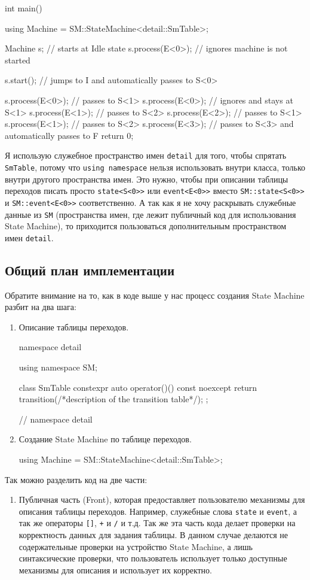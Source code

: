 \documentclass{article}
\begin{document}
{\begin{cppcode}
int main() {

  using Machine = SM::StateMachine<detail::SmTable>;

  Machine s;         // starts at Idle state
  s.process(E<0>{}); // ignores machine is not started

  s.start();         // jumps to I and automatically passes to S<0>

  s.process(E<0>{}); // passes to S<1>
  s.process(E<0>{}); // ignores and stays at S<1>
  s.process(E<1>{}); // passes to S<2>
  s.process(E<2>{}); // passes to S<1>
  s.process(E<1>{}); // passes to S<2>
  s.process(E<3>{}); // passes to S<3> and automatically passes to F
  return 0;
}
\end{cppcode}
Я использую служебное пространство имен \verb"detail" для того, чтобы спрятать \verb"SmTable", потому что \verb"using namespace" нельзя использовать внутри класса, только внутри другого пространства имен.
Это нужно, чтобы при описании таблицы переходов писать просто \verb"state<S<0>>" или \verb"event<E<0>>" вместо \verb"SM::state<S<0>>" и \verb"SM::event<E<0>>" соответственно.
А так как я не хочу раскрывать служебные данные из \verb"SM" (пространства имен, где лежит публичный код для использования State Machine), то приходится пользоваться дополнительным пространством имен \verb"detail".

\subsection{Общий план имплементации}

Обратите внимание на то, как в коде выше у нас процесс создания State Machine разбит на два шага:
\begin{enumerate}
\item Описание таблицы переходов.
\begin{cppcode}[\nonumbers]
namespace detail {
using namespace SM;

class SmTable {
  constexpr auto operator()() const noexcept {
    return transition(/*description of the transition table*/);
  }
};
} // namespace detail
\end{cppcode}

\item Создание State Machine по таблице переходов.
\begin{cppcode}[\nonumbers]
using Machine = SM::StateMachine<detail::SmTable>;
\end{cppcode}
\end{enumerate}
Так можно разделить код на две части:
\begin{enumerate}
\item Публичная часть (Front), которая предоставляет пользователю механизмы для описания таблицы переходов.
Например, служебные слова \verb"state" и \verb"event", а так же операторы \verb"[]", \verb"+" и \verb"/" и т.д.
Так же эта часть кода делает проверки на корректность данных для задания таблицы.
В данном случае делаются не содержательные проверки на устройство State Machine, а лишь синтаксические проверки, что пользователь использует только доступные механизмы для описания и использует их корректно.


\end{enumerate}}
\end{document}
